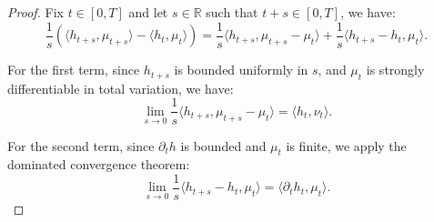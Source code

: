 \documentclass[11pt,a4paper]{article}
\begin{document}
    \begin{proof}
    Fix $t \in [0,T]$ and let $s \in \mathbb{R}$ such that $t + s \in [0,T]$, we have:
    \[
    \frac{1}{s} \left( \langle h_{t+s}, \mu_{t+s} \rangle - \langle h_t, \mu_t \rangle \right) = \frac{1}{s} \langle h_{t+s}, \mu_{t+s} - \mu_t \rangle + \frac{1}{s} \langle h_{t+s} - h_t, \mu_t \rangle.
    \]
    
    For the first term, since $h_{t+s}$ is bounded uniformly in $s$, and $\mu_t$ is strongly differentiable in total variation, we have:
    \[
    \lim_{s \to 0} \frac{1}{s} \langle h_{t+s}, \mu_{t+s} - \mu_t \rangle = \langle h_t, \nu_t \rangle.
    \]
    
    For the second term, since $\partial_t h$ is bounded and $\mu_t$ is finite, we apply the dominated convergence theorem:
    \[
    \lim_{s \to 0} \frac{1}{s} \langle h_{t+s} - h_t, \mu_t \rangle = \langle \partial_t h_t, \mu_t \rangle.
    \]
    \end{proof}
    
\end{document}
